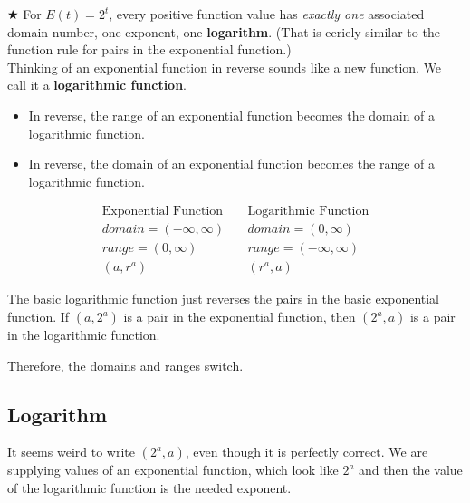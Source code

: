 \documentclass{ximera}
\begin{document}
\textbf{\textcolor{red!90!darkgray}{$\bigstar$}} For $E(t) = 2^t$, every positive function value has \textit{exactly one} associated domain number, one exponent, one \textbf{\textcolor{purple!85!blue}{logarithm}}. (That is eeriely similar to the function rule for pairs in the exponential function.) \\ 




Thinking of an exponential function in reverse sounds like a new function. We call it a \textbf{\textcolor{purple!85!blue}{logarithmic function}}.   \\


\begin{itemize}
\item In reverse, the range of an exponential function becomes the domain of a logarithmic function.
\item In reverse, the domain of an exponential function becomes the range of a logarithmic function.
\end{itemize}





\[
\begin{array}{lcl}
\text{Exponential Function}  &     &  \text{Logarithmic Function}  \\
domain = (-\infty, \infty)  &  \   &  domain = (0, \infty)  \\
range = (0, \infty)  &    &  range = (-\infty, \infty)  \\
(a, r^a)    &    &   (r^a, a)
\end{array}
\]


The basic logarithmic function just reverses the pairs in the basic exponential function.  If $(a, 2^a)$ is a pair in the exponential function, then $(2^a, a)$ is a pair in the logarithmic function.


Therefore, the domains and ranges switch. \\






\subsection*{Logarithm}

It seems weird to write $(2^a, a)$, even though it is perfectly correct.  We are supplying values of an exponential function, which look like $2^a$ and then the value of the logarithmic function is the needed exponent.
\end{document}
